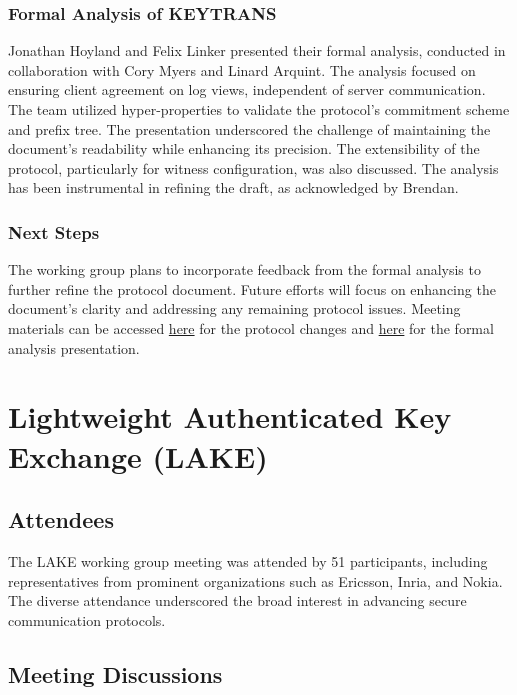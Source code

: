 \documentclass{article}
\begin{document}
\subsubsection{Formal Analysis of KEYTRANS}
Jonathan Hoyland and Felix Linker presented their formal analysis, conducted in collaboration with Cory Myers and Linard Arquint. The analysis focused on ensuring client agreement on log views, independent of server communication. The team utilized hyper-properties to validate the protocol's commitment scheme and prefix tree. The presentation underscored the challenge of maintaining the document's readability while enhancing its precision. The extensibility of the protocol, particularly for witness configuration, was also discussed. The analysis has been instrumental in refining the draft, as acknowledged by Brendan.

\subsubsection{Next Steps}
The working group plans to incorporate feedback from the formal analysis to further refine the protocol document. Future efforts will focus on enhancing the document's clarity and addressing any remaining protocol issues. Meeting materials can be accessed \href{https://datatracker.ietf.org/meeting/122/materials/slides-122-keytrans-updated-draft-ietf-keytrans-protocol-00}{here} for the protocol changes and \href{https://datatracker.ietf.org/meeting/122/materials/slides-122-keytrans-formal-analysis-and-comments-on-draft-00}{here} for the formal analysis presentation.



\newpage

\section{Lightweight Authenticated Key Exchange (LAKE)}

\subsection{Attendees}

The LAKE working group meeting was attended by 51 participants, including representatives from prominent organizations such as Ericsson, Inria, and Nokia. The diverse attendance underscored the broad interest in advancing secure communication protocols.

\subsection{Meeting Discussions}
\end{document}
